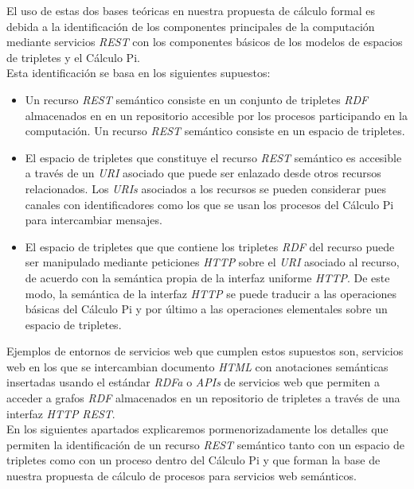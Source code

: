 El uso de estas dos bases te\'oricas en nuestra propuesta de c\'alculo formal es debida a la identificaci\'on de los componentes principales de la computaci\'on mediante servicios \textit{REST} con los componentes b\'asicos de los modelos de espacios de tripletes y el C\'alculo Pi.\\

Esta identificaci\'on se basa en los siguientes supuestos:
\begin{itemize}

\item Un recurso \textit{REST} sem\'antico consiste en un conjunto de tripletes \textit{RDF} almacenados en en un repositorio accesible por los procesos participando en la computaci\'on. Un recurso \textit{REST} sem\'antico consiste en un espacio de tripletes.

\item El espacio de tripletes que constituye el recurso \textit{REST} sem\'antico es accesible a trav\'es de un \textit{URI} asociado que puede ser enlazado desde otros recursos relacionados. Los \textit{URIs} asociados a los recursos se pueden considerar pues canales con identificadores como los que se usan los procesos del C\'alculo Pi para intercambiar mensajes.

\item El espacio de tripletes que que contiene los tripletes \textit{RDF} del recurso puede ser manipulado mediante peticiones \textit{HTTP} sobre el \textit{URI} asociado al recurso, de acuerdo con la sem\'antica propia de la interfaz uniforme \textit{HTTP}. De este modo, la sem\'antica de la interfaz \textit{HTTP} se puede traducir a las operaciones b\'asicas del C\'alculo Pi y por \'ultimo a las operaciones elementales sobre un espacio de tripletes.

\end{itemize}

Ejemplos de entornos de servicios web que cumplen estos supuestos son, servicios web en los que se intercambian documento \textit{HTML} con anotaciones sem\'anticas insertadas usando el est\'andar \textit{RDFa} o \textit{APIs} de servicios web que permiten a acceder a grafos \textit{RDF} almacenados en un repositorio de tripletes a trav\'es de una interfaz \textit{HTTP} \textit{REST}.\\
En los siguientes apartados explicaremos pormenorizadamente los detalles que permiten la identificaci\'on de un recurso \textit{REST} sem\'antico tanto con un espacio de tripletes como con un proceso dentro del C\'alculo Pi y que forman la base de nuestra propuesta de c\'alculo de procesos para servicios web sem\'anticos.

